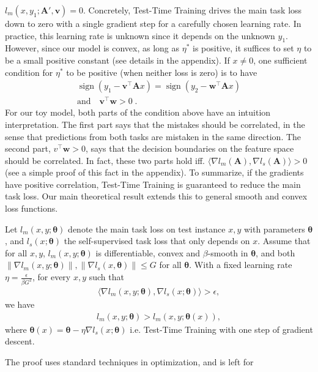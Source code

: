 \documentclass{article}
\theoremstyle{plain}
\theoremstyle{remark}
\theoremstyle{definition}
\newcommand{\grad}{\nabla}
\newcommand{\opt}{^*}
\def\norm#1{\left\| #1 \right\|}
\def\eps{{\epsilon}}
\def\vtheta{{\bm{\theta}}}
\def\vv{{\bm{v}}}
\def\vw{{\bm{w}}}
\def\mA{{\bm{A}}}
\DeclareMathOperator{\sign}{sign}
\begin{document}
$l_m(x, y_1; \mA', \vv) = 0$.  
Concretely, Test-Time Training drives the main task loss down to zero with a single gradient step for a carefully chosen learning rate. 
In practice, this learning rate is unknown since it depends on the unknown $y_1$.
However, since our model is convex, as long as $\eta\opt$ is positive, it suffices to set $\eta$ to be a small positive constant (see details in the appendix).
If $x \neq 0$, one sufficient condition for $\eta^*$ to be positive (when neither loss is zero) is to have
\begin{align}
\label{equal_sign}
    \sign\left( y_1 - \vv^\top \mA x \right) = \sign\left( y_2 - \vw^\top \mA x \right)\\
    \text{and}\quad
    \vv^\top \vw > 0 \;.
\end{align}
For our toy model, both parts of the condition above have an intuition interpretation.
The first part says that the mistakes should be correlated, in the sense
that predictions from both tasks are mistaken in the same direction. The second
part, $v^\top \vw > 0$, says that the decision boundaries on the feature
space should be correlated. In fact, these two parts hold iff.
$\langle \grad l_m(\mA), \grad l_s(\mA)\rangle > 0$ 
(see a simple proof of this fact in the appendix). To summarize, if the gradients have
positive correlation, Test-Time Training is guaranteed to reduce the main task loss.
Our main theoretical result extends this to general smooth and convex loss functions.

\newpage
{\theorem	\label{main_theorem}
Let $l_m(x, y; \vtheta)$ denote the main task loss on test instance $x, y$ with
parameters $\vtheta$, and $l_s(x; \vtheta)$ the self-supervised task loss that only depends on $x$.
Assume that for all $x, y$,
$l_m(x, y; \vtheta)$ is differentiable, convex and $\beta$-smooth
in $\vtheta$,
and both
$\norm{\grad l_m(x, y; \vtheta)}, \norm{\grad l_s(x, \vtheta)} \leq G$ 
for all $\vtheta$.
With a fixed learning rate $\eta = \frac{\eps}{\beta G^2}$, 
for every $x, y$ such that 
\begin{align}
\langle \grad l_m(x, y; \vtheta), \grad l_s(x; \vtheta) \rangle  > \eps,
\end{align}
we have
\begin{align}
l_m(x, y; \vtheta)
>  l_m(x, y; \vtheta(x)),
\end{align}
where $\vtheta(x) = \vtheta - \eta \grad l_s(x; \vtheta)$ i.e. Test-Time Training with one step of gradient descent.
}

The proof uses standard techniques in optimization, and is left for
\end{document}
